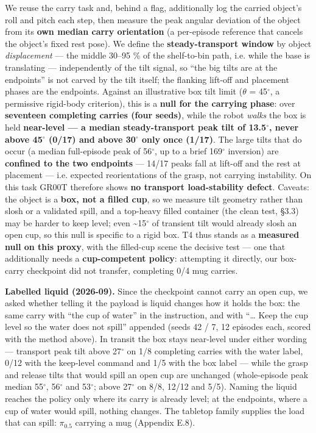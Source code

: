 We reuse the carry task and, behind a flag, additionally log the carried object's roll and pitch each step, then measure the peak angular deviation of the object from its \textbf{own median carry orientation} (a per-episode reference that cancels the object's fixed rest pose). We define the \textbf{steady-transport window} by object \emph{displacement} --- the middle 30--95 \% of the shelf-to-bin path, i.e. while the base is translating --- independently of the tilt signal, so ``the big tilts are at the endpoints'' is not carved by the tilt itself; the flanking lift-off and placement phases are the endpoints. Against an illustrative box tilt limit ($\theta$ = 45$^{\circ}$, a permissive rigid-body criterion), this is a \textbf{null for the carrying phase}: over \textbf{seventeen completing carries (four seeds)}, while the robot \emph{walks} the box is held \textbf{near-level --- a median steady-transport peak tilt of 13.5$^{\circ}$, never above 45$^{\circ}$ (0/17) and above 30$^{\circ}$ only once (1/17)}. The large tilts that do occur (a median full-episode peak of 56$^{\circ}$, up to a brief 169$^{\circ}$ inversion) are \textbf{confined to the two endpoints} --- 14/17 peaks fall at lift-off and the rest at placement --- i.e. expected reorientations of the grasp, not carrying instability. On this task GR00T therefore shows \textbf{no transport load-stability defect}. Caveats: the object is a \textbf{box, not a filled cup}, so we measure tilt geometry rather than slosh or a validated spill, and a top-heavy filled container (the clean test, \S3.3) may be harder to keep level; even \textasciitilde{}15$^{\circ}$ of transient tilt would already slosh an open cup, so this null is specific to a rigid box. T4 thus stands as a \textbf{measured null on this proxy}, with the filled-cup scene the decisive test --- one that additionally needs a \textbf{cup-competent policy}: attempting it directly, our box-carry checkpoint did not transfer, completing 0/4 mug carries.

\textbf{Labelled liquid (2026-09).} Since the checkpoint cannot carry an open cup, we asked whether telling it the payload is liquid changes how it holds the box: the same carry with ``the cup of water'' in the instruction, and with ``\ldots{} Keep the cup level so the water does not spill'' appended (seeds 42 / 7, 12 episodes each, scored with the method above). In transit the box stays near-level under either wording --- transport peak tilt above 27$^{\circ}$ on 1/8 completing carries with the water label, 0/12 with the keep-level command and 1/5 with the box label --- while the grasp and release tilts that would spill an open cup are unchanged (whole-episode peak median 55$^{\circ}$, 56$^{\circ}$ and 53$^{\circ}$; above 27$^{\circ}$ on 8/8, 12/12 and 5/5). Naming the liquid reaches the policy only where its carry is already level; at the endpoints, where a cup of water would spill, nothing changes. The tabletop family supplies the load that can spill: $\pi_{0.5}$ carrying a mug (Appendix E.8).


